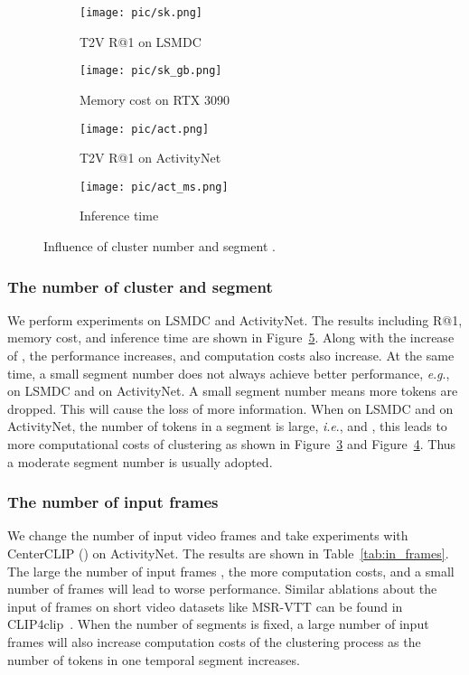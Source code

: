 \documentclass[sigconf]{acmart}
\newcommand{\ie}{\textit{i}.\textit{e}.}
\newcommand{\eg}{\textit{e}.\textit{g}.}
\begin{document}
\begin{figure}[tbp]
	\centering
\begin{subfigure}{.235\textwidth}
		\centering
		\texttt{[image: pic/sk.png]} 
		\caption{T2V R@1 on LSMDC}
		\label{fig_ks_1}
	\end{subfigure}\begin{subfigure}{.235\textwidth}
		\centering
		\texttt{[image: pic/sk\_gb.png]} 
		\caption{Memory cost on RTX 3090}
		\label{fig_ks_2}
	\end{subfigure}
	\begin{subfigure}{.235\textwidth}
	\centering
	\texttt{[image: pic/act.png]} 
	\caption{T2V R@1 on ActivityNet}
	\label{fig_ks_3}
	\end{subfigure}
	\begin{subfigure}{.235\textwidth}
	\centering
	\texttt{[image: pic/act\_ms.png]} 
	\caption{Inference time}
	\label{fig_ks_4}
	\end{subfigure}	
	\caption{Influence of cluster number  and segment .}
	\label{fig_ks}
\end{figure}


\subsubsection{The number of cluster  and segment }
We perform experiments on LSMDC and ActivityNet.
The results including R@1, memory cost, and inference time
are shown in Figure~\ref{fig_ks}.
Along with the increase of , the performance increases, and computation costs also increase.
At the same time, a small segment number  does not always achieve
better performance, \eg,  on LSMDC and  on ActivityNet.
A small segment number means more tokens are dropped.
This will cause the loss of more information.
When  on LSMDC and  on ActivityNet, the number of tokens
in a segment is large, \ie,  and ,
this leads to more computational costs of clustering as shown in Figure~\ref{fig_ks_3}
and Figure~\ref{fig_ks_4}.
Thus a moderate segment number  is usually adopted.
 
\subsubsection{The number of input frames }
We change the number of input video frames and take experiments
with CenterCLIP () on ActivityNet.
The results are shown in Table~\ref{tab:in_frames}.
The large the number of input frames ,
the more computation costs,
and a small number of frames will lead to worse performance.
Similar ablations about the input of frames on short video
datasets like MSR-VTT can be found in CLIP4clip~\cite{2021clip4clip}.
When the number of segments  is fixed, a large number
of input frames  will also increase computation 
costs of the clustering process as the number of tokens in one temporal segment increases.
\end{document}

